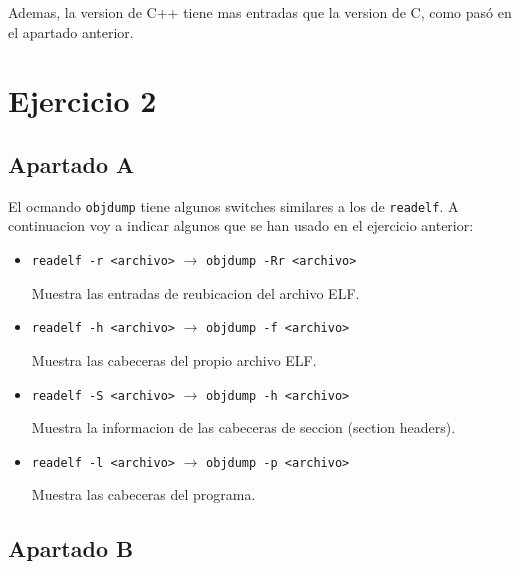 \documentclass{article}
\begin{document}
Ademas, la version de C++ tiene mas entradas que la version de C, como pasó en el apartado anterior.


\section*{Ejercicio 2}


\subsection*{Apartado A}

El ocmando \verb|objdump| tiene algunos switches similares a los de \verb|readelf|. A continuacion voy a indicar algunos que se han usado en el ejercicio anterior:

\begin{itemize}
    \item \verb|readelf -r <archivo>| $\rightarrow$ \verb|objdump -Rr <archivo>|
    
    
    Muestra las entradas de reubicacion del archivo ELF.



    \item \verb|readelf -h <archivo>| $\rightarrow$ \verb|objdump -f <archivo>|
    
    Muestra las cabeceras del propio archivo ELF.


    \item \verb|readelf -S <archivo>| $\rightarrow$ \verb|objdump -h <archivo>|
    
    Muestra la informacion de las cabeceras de seccion (section headers).


    \item \verb|readelf -l <archivo>| $\rightarrow$ \verb|objdump -p <archivo>|
    
    Muestra las cabeceras del programa.


\end{itemize}


\subsection*{Apartado B}
\end{document}

